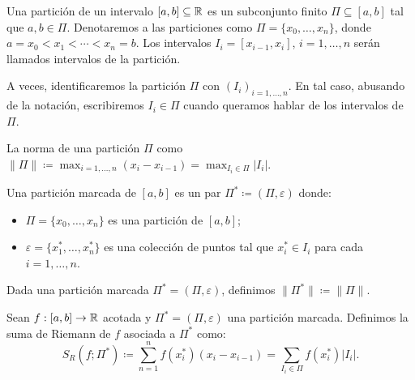 
\begin{definition}
	Una partición de un intervalo $[a,b]\subseteq\mathbb{R}$ es un subconjunto finito $\Pi\subseteq[a,b]$ tal que $a,b\in\Pi$. Denotaremos a las particiones como $\Pi=\{x_0,\dots,x_n\}$, donde $a=x_0<x_1<\cdots<x_n=b$. Los intervalos $I_i=[x_{i-1},x_i]$, $i=1,\dots,n$ serán llamados intervalos de la partición.
\end{definition}

\begin{remark}
	A veces, identificaremos la partición $\Pi$ con $(I_i)_{i=1,\dots,n}$. En tal caso, abusando de la notación, escribiremos $I_i\in\Pi$ cuando queramos hablar de los intervalos de $\Pi$.
\end{remark}

\begin{definition}
	La norma de una partición $\Pi$ como $\|\Pi\|\coloneqq \max_{i=1,\dots,n}(x_i-x_{i-1})=\max_{I_i\in\Pi}|I_i|$.
\end{definition}

\begin{definition}
	Una partición marcada de $[a,b]$ es un par $\Pi^*\coloneqq(\Pi,\varepsilon)$ donde:
	\begin{itemize}
		\item $\Pi = \{x_0,\dots,x_n\}$ es una partición de $[a,b]$;
		\item $\varepsilon = \{x_1^*,\dots,x_n^*\}$ es una colección de puntos tal que $x_i^*\in I_i$ para cada $i=1,\dots,n$.
	\end{itemize}
\end{definition}

\begin{remark}
	Dada una partición marcada $\Pi^*=(\Pi,\varepsilon)$, definimos $\|\Pi^*\|\coloneqq \|\Pi\|$.
\end{remark}

\begin{definition}
	Sean $f:[a,b]\to\mathbb{R}$ acotada y $\Pi^*=(\Pi,\varepsilon)$ una partición marcada. Definimos la suma de Riemann de $f$ asociada a $\Pi^*$ como:
	\[
	S_R(f;\Pi^*)\coloneqq \sum_{n=1}^{n} f(x_i^*)(x_i-x_{i-1})= \sum_{I_i\in\Pi}^{} f(x_i^*)|I_i|.
	\]
\end{definition}

